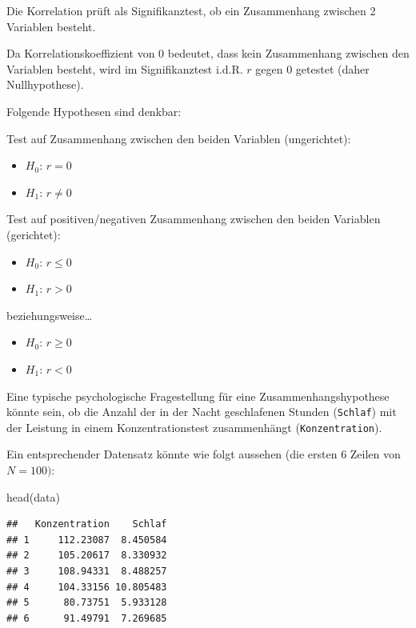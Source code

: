 \documentclass[
]{book}
\newenvironment{Shaded}{\begin{snugshade}}{\end{snugshade}}
\newcommand{\FunctionTok}[1]{\textcolor[rgb]{0.00,0.00,0.00}{#1}}
\newcommand{\NormalTok}[1]{#1}
\providecommand{\tightlist}{%
  \setlength{\itemsep}{0pt}\setlength{\parskip}{0pt}}
\begin{document}
Die Korrelation prüft als Signifikanztest, ob ein Zusammenhang zwischen 2 Variablen besteht.

Da Korrelationskoeffizient von 0 bedeutet, dass kein Zusammenhang zwischen den Variablen besteht, wird im Signifikanztest i.d.R. \(r\) gegen 0 getestet (daher Nullhypothese).

Folgende Hypothesen sind denkbar:

Test auf Zusammenhang zwischen den beiden Variablen (ungerichtet):

\begin{itemize}
\tightlist
\item
  \(H_0\): \(r = 0\)
\item
  \(H_1\): \(r \neq 0\)
\end{itemize}

Test auf positiven/negativen Zusammenhang zwischen den beiden Variablen (gerichtet):

\begin{itemize}
\tightlist
\item
  \(H_0\): \(r \leq 0\)
\item
  \(H_1\): \(r > 0\)
\end{itemize}

beziehungsweise\ldots{}

\begin{itemize}
\tightlist
\item
  \(H_0\): \(r \geq 0\)
\item
  \(H_1\): \(r < 0\)
\end{itemize}

Eine typische psychologische Fragestellung für eine Zusammenhangshypothese könnte sein, ob die Anzahl der in der Nacht geschlafenen Stunden (\texttt{Schlaf}) mit der Leistung in einem Konzentrationstest zusammenhängt (\texttt{Konzentration}).

Ein entsprechender Datensatz könnte wie folgt aussehen (die ersten 6 Zeilen von \(N=100)\):

\begin{Shaded}
\begin{Highlighting}[]
\FunctionTok{head}\NormalTok{(data)}
\end{Highlighting}
\end{Shaded}

\begin{verbatim}
##   Konzentration    Schlaf
## 1     112.23087  8.450584
## 2     105.20617  8.330932
## 3     108.94331  8.488257
## 4     104.33156 10.805483
## 5      80.73751  5.933128
## 6      91.49791  7.269685
\end{verbatim}
\end{document}
